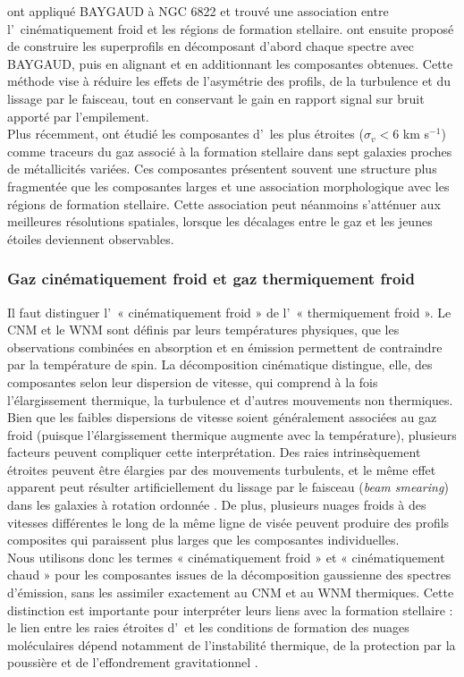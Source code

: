 \citet{Park2022} ont appliqué BAYGAUD à NGC 6822 et trouvé une association entre l'\HI\ cinématiquement froid et les régions de formation stellaire. \citet{KimOh2022} ont ensuite proposé de construire les superprofils en décomposant d'abord chaque spectre avec BAYGAUD, puis en alignant et en additionnant les composantes obtenues. Cette méthode vise à réduire les effets de l'asymétrie des profils, de la turbulence et du lissage par le faisceau, tout en conservant le gain en rapport signal sur bruit apporté par l'empilement.\\\indent
Plus récemment, \citet{Park2025} ont étudié les composantes d'\HI\ les plus étroites ($\sigma_v < 6$ km s$^{-1}$) comme traceurs du gaz associé à la formation stellaire dans sept galaxies proches de métallicités variées. Ces composantes présentent souvent une structure plus fragmentée que les composantes larges et une association morphologique avec les régions de formation stellaire. Cette association peut néanmoins s'atténuer aux meilleures résolutions spatiales, lorsque les décalages entre le gaz et les jeunes étoiles deviennent observables.

\subsubsection{Gaz cinématiquement froid et gaz thermiquement froid}
\label{subsubsec:kinematic_vs_thermal}

Il faut distinguer l'\HI\ « cinématiquement froid » de l'\HI\ « thermiquement froid ». Le CNM et le WNM sont définis par leurs températures physiques, que les observations combinées en absorption et en émission permettent de contraindre par la température de spin. La décomposition cinématique distingue, elle, des composantes selon leur dispersion de vitesse, qui comprend à la fois l'élargissement thermique, la turbulence et d'autres mouvements non thermiques.\\\indent
Bien que les faibles dispersions de vitesse soient généralement associées au gaz froid (puisque l'élargissement thermique augmente avec la température), plusieurs facteurs peuvent compliquer cette interprétation. Des raies intrinsèquement étroites peuvent être élargies par des mouvements turbulents, et le même effet apparent peut résulter artificiellement du lissage par le faisceau (\textit{beam smearing}) dans les galaxies à rotation ordonnée \citep{Ianjamasimanana2012, Caldu-Primo2013, Stilp2013}. De plus, plusieurs nuages froids à des vitesses différentes le long de la même ligne de visée peuvent produire des profils composites qui paraissent plus larges que les composantes individuelles.\\\indent
Nous utilisons donc les termes « cinématiquement froid » et « cinématiquement chaud » pour les composantes issues de la décomposition gaussienne des spectres d'émission, sans les assimiler exactement au CNM et au WNM thermiques. Cette distinction est importante pour interpréter leurs liens avec la formation stellaire : le lien entre les raies étroites d'\HI\ et les conditions de formation des nuages moléculaires dépend notamment de l'instabilité thermique, de la protection par la poussière et de l'effondrement gravitationnel \citep{Schaye2004, Krumholtz2011, Klessen2016}.

